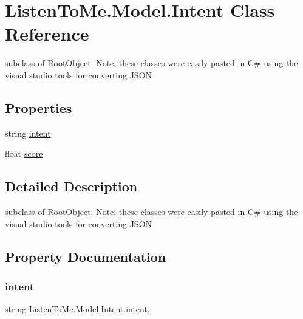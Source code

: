 \hypertarget{class_listen_to_me_1_1_model_1_1_intent}{}\section{Listen\+To\+Me.\+Model.\+Intent Class Reference}
\label{class_listen_to_me_1_1_model_1_1_intent}


subclass of Root\+Object. Note\+: these classes were easily pasted in C\# using the visual studio tools for converting J\+S\+ON  


\subsection*{Properties}
\begin{DoxyCompactItemize}
\item 
string \mbox{\hyperlink{class_listen_to_me_1_1_model_1_1_intent_a72e3844bbc2658989213e3182068c3d4}{intent}}
\item 
float \mbox{\hyperlink{class_listen_to_me_1_1_model_1_1_intent_a82e80d6b2c310b22beacb60637a03d20}{score}}
\end{DoxyCompactItemize}


\subsection{Detailed Description}
subclass of Root\+Object. Note\+: these classes were easily pasted in C\# using the visual studio tools for converting J\+S\+ON 



\subsection{Property Documentation}
\mbox{\label{class_listen_to_me_1_1_model_1_1_intent_a72e3844bbc2658989213e3182068c3d4}} 
\subsubsection{\texorpdfstring{intent}{intent}}
{\footnotesize\ttfamily string Listen\+To\+Me.\+Model.\+Intent.\+intent\hspace{0.3cm}{\ttfamily [get]}, {\ttfamily [set]}}

